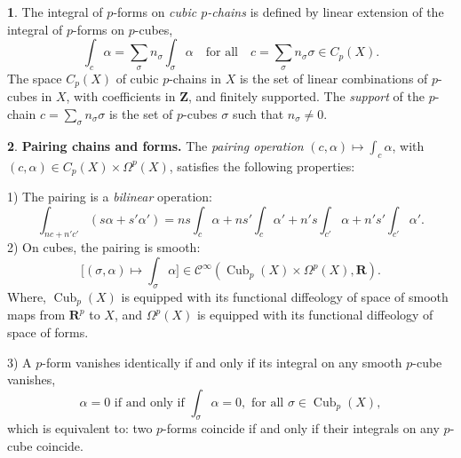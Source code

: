 \documentclass[11pt,reqno]{amsart}
\theoremstyle{definition}
\newtheorem{article}{}
\newcommand{\artlabel}[1]{{\bf #1.}}
\newcommand{\qmbox}[1]{\quad \mbox{#1}\quad}
\newcommand{\RR}{{\mathbf R}}
\newcommand{\ZZ}{{\mathbf Z}}
\def \X{{X}}
\newcommand{\cC}{{\mathcal C}}
\newcommand{\DCubes}[1]{\operatorname{Cub}_{#1}}
\newcommand{\DChains}[1]{C_{#1}}
\newcommand{\Cinf}{{\cC}^\infty}
\begin{document}
\begin{article}
    The integral of $p$-forms on {\em cubic
    $p$-chains} is defined by linear extension of the
    integral of $p$-forms on  $p$-cubes,
    $$
      \int_{c} \alpha
      = \sum_\sigma n_\sigma \int_\sigma \alpha \qmbox{for all} 
      c = \sum_\sigma n_\sigma \sigma \in \DChains{p}(\X).
      $$
    The space $\DChains{p}(\X)$ of cubic $p$-chains in $\X$
    is the set of linear combinations of $p$-cubes
    in $\X$, with coefficients in $\ZZ$, and finitely supported. 
    The {\em support} of the $p$-chain $c = \sum_\sigma n_\sigma \sigma$ is the set 
    of $p$-cubes $\sigma$ such that $n_\sigma \neq 0$.
  \end{article} %
  
  \begin{article}\artlabel{Pairing chains and forms} 
    \label{Pairing-chains-and-forms}
    The {\em pairing operation}
    $(c,\alpha) \mapsto \displaystyle \int_c\alpha$, with $(c,\alpha) \in \DChains{p}(\X) \times
      \Omega^p(\X)$, satisfies the following properties:

    1) The pairing is a {\em bilinear} operation: 
      $$
        \int_{nc+n'c'}(s\alpha +s'\alpha') = ns\int_c\alpha + ns'\int_c\alpha'
        + n's\int_{c'}\alpha + n's'\int_{c'}\alpha'.
        $$
    2) On cubes, the pairing is smooth: 
      $$
        \bigg[(\sigma,\alpha) \mapsto \int_\sigma\alpha\bigg] \in \Cinf(\DCubes{p}(\X) \times \Omega^p(\X),\RR). 
        $$
      Where, $\DCubes{p}(\X)$ is equipped with its functional
      diffeology of space of smooth maps from $\RR^p$ to $\X$,
      and $\Omega^p(\X)$ is equipped with its functional
      diffeology of space of forms.
      
      3) A $p$-form vanishes identically if and
      only if its integral on any
      smooth $p$-cube vanishes,
      $$
        \alpha =
        0 \mbox{ if and only if } \int_\sigma \alpha = 0,
        \mbox{ for all } \sigma \in \DCubes{p}(\X), 
        $$
      which is equivalent to: two $p$-forms
      coincide if and only if their integrals on any $p$-cube
      coincide. 
  \end{article} %
  
\end{document}
